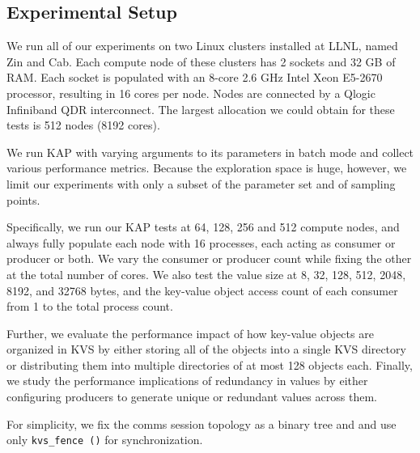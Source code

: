 \subsection{Experimental Setup}
We run all of our experiments on two Linux clusters installed at LLNL,
named Zin and Cab.
Each compute node of these clusters has 2 sockets and 32 GB of RAM.
Each socket is populated with an 8-core 2.6 GHz Intel
Xeon E5-2670 processor, resulting in 16 cores per node.
Nodes are connected by a Qlogic Infiniband QDR interconnect.
The largest allocation we could obtain for these tests is
512 nodes (8192 cores).

We run KAP with varying arguments to its parameters
in batch mode and collect various 
performance metrics. 
Because the exploration
space is huge, however, we limit our experiments with
only a subset of the parameter set and of sampling points.

Specifically, we run our KAP tests at 64, 128, 256 and 512
compute nodes, and always fully populate each node with
16 processes, each acting as consumer or producer or
both. We vary the consumer or producer count
while fixing the other at the total number of cores.
We also test the value size at
8, 32, 128, 512, 2048, 8192, and 32768 bytes,
and the key-value object access count of each consumer
from 1 to the total process count.

Further, we evaluate the performance impact 
of how key-value objects are organized 
in KVS by either storing all of the objects into a single KVS directory
or distributing them into multiple directories of at most 128 objects each.
Finally, we study the performance implications of 
redundancy in values by either configuring producers to generate
unique or redundant values across them.

For simplicity, we fix the comms session topology as a binary tree
and and use only {\tt kvs\_fence ()} for synchronization.
